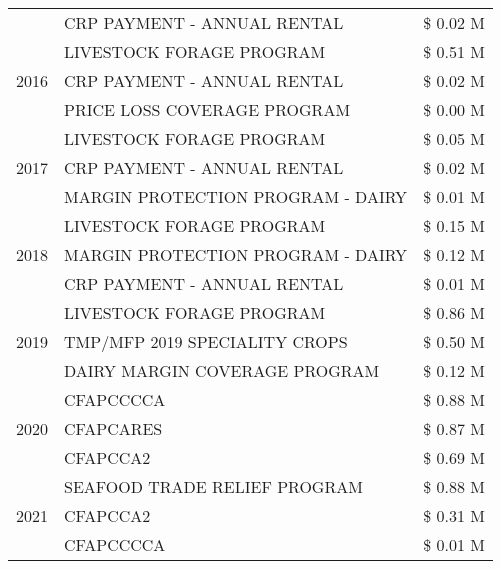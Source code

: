 \begin{tabular}{llr}
 & CRP PAYMENT - ANNUAL RENTAL & \$ 0.02 M \\
\cline{1-3}
\multirow[t]{3}{*}{2016} & LIVESTOCK FORAGE PROGRAM & \$ 0.51 M \\
 & CRP PAYMENT - ANNUAL RENTAL & \$ 0.02 M \\
 & PRICE LOSS COVERAGE PROGRAM & \$ 0.00 M \\
\cline{1-3}
\multirow[t]{3}{*}{2017} & LIVESTOCK FORAGE PROGRAM & \$ 0.05 M \\
 & CRP PAYMENT - ANNUAL RENTAL & \$ 0.02 M \\
 & MARGIN PROTECTION PROGRAM - DAIRY & \$ 0.01 M \\
\cline{1-3}
\multirow[t]{3}{*}{2018} & LIVESTOCK FORAGE PROGRAM & \$ 0.15 M \\
 & MARGIN PROTECTION PROGRAM - DAIRY & \$ 0.12 M \\
 & CRP PAYMENT - ANNUAL RENTAL & \$ 0.01 M \\
\cline{1-3}
\multirow[t]{3}{*}{2019} & LIVESTOCK FORAGE PROGRAM & \$ 0.86 M \\
 & TMP/MFP 2019 SPECIALITY CROPS & \$ 0.50 M \\
 & DAIRY MARGIN COVERAGE PROGRAM & \$ 0.12 M \\
\cline{1-3}
\multirow[t]{3}{*}{2020} & CFAPCCCCA & \$ 0.88 M \\
 & CFAPCARES & \$ 0.87 M \\
 & CFAPCCA2 & \$ 0.69 M \\
\cline{1-3}
\multirow[t]{3}{*}{2021} & SEAFOOD TRADE RELIEF PROGRAM & \$ 0.88 M \\
 & CFAPCCA2 & \$ 0.31 M \\
 & CFAPCCCCA & \$ 0.01 M \\
\cline{1-3}
\bottomrule
\end{tabular}
